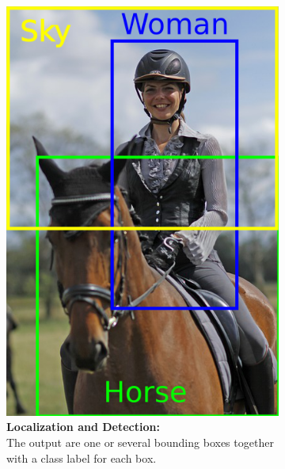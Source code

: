 \begin{figure}
    \begin{subfigure}[t]{0.32\columnwidth}
        \centering
        \includegraphics[width=\columnwidth]{figures/horsewoman_loc.png}
        \caption{ \textbf{Localization and Detection:}\\ The output are one or several bounding boxes together with a class label for each box.}
        \label{fig:sfig2}
    \end{subfigure} \hspace{0.004\textwidth}
    \begin{subfigure}[t]{0.32\columnwidth}
        \centering

\end{subfigure}
\end{figure}
